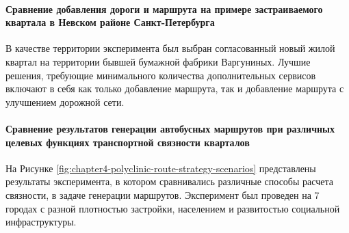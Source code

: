 \paragraph*{Сравнение добавления дороги и маршрута на примере застраиваемого квартала в Невском районе Санкт-Петербурга}
В качестве территории эксперимента был выбран согласованный новый жилой квартал на территории бывшей бумажной фабрики Варгуниных. Лучшие решения, требующие минимального количества дополнительных сервисов включают в себя как только добавление маршрута, так и добавление маршрута с улучшением дорожной сети.

\paragraph*{Сравнение результатов генерации автобусных маршрутов при различных целевых функциях транспортной связности кварталов}
На Рисунке \ref{fig:chapter4-polyclinic-route-strategy-scenarios} представлены результаты эксперимента, в котором сравнивались различные способы расчета связности, в задаче генерации маршрутов. Эксперимент был проведен на 7 городах с разной плотностью застройки, населением и развитостью социальной инфраструктуры.
